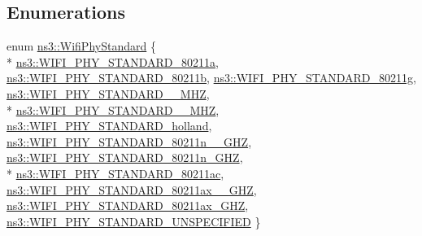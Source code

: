\subsection*{Enumerations}
\begin{DoxyCompactItemize}
\item 
enum \hyperlink{group__wifi_ga1299834f4e1c615af3ca738033b76a49}{ns3\+::\+Wifi\+Phy\+Standard} \{ \\*
\hyperlink{group__wifi_gga1299834f4e1c615af3ca738033b76a49a22db1e8022db2c3450414b86c77b11e4}{ns3\+::\+W\+I\+F\+I\+\_\+\+P\+H\+Y\+\_\+\+S\+T\+A\+N\+D\+A\+R\+D\+\_\+80211a}, 
\hyperlink{group__wifi_gga1299834f4e1c615af3ca738033b76a49a77e1cc9f77a0bce8e2bc82cbef437b5a}{ns3\+::\+W\+I\+F\+I\+\_\+\+P\+H\+Y\+\_\+\+S\+T\+A\+N\+D\+A\+R\+D\+\_\+80211b}, 
\hyperlink{group__wifi_gga1299834f4e1c615af3ca738033b76a49aeda6d90f260393ce003ec4765d8100af}{ns3\+::\+W\+I\+F\+I\+\_\+\+P\+H\+Y\+\_\+\+S\+T\+A\+N\+D\+A\+R\+D\+\_\+80211g}, 
\hyperlink{group__wifi_gga1299834f4e1c615af3ca738033b76a49aff863c98db467eb76170dc8bbe743de7}{ns3\+::\+W\+I\+F\+I\+\_\+\+P\+H\+Y\+\_\+\+S\+T\+A\+N\+D\+A\+R\+D\+\_\+\_\+M\+HZ}, 
\\*
\hyperlink{group__wifi_gga1299834f4e1c615af3ca738033b76a49a8311083bdd8ae58e73ab6e81a53fd7be}{ns3\+::\+W\+I\+F\+I\+\_\+\+P\+H\+Y\+\_\+\+S\+T\+A\+N\+D\+A\+R\+D\+\_\+\_\+M\+HZ}, 
\hyperlink{group__wifi_gga1299834f4e1c615af3ca738033b76a49aca926d77ddca0fc6d8cdcb190b2e520e}{ns3\+::\+W\+I\+F\+I\+\_\+\+P\+H\+Y\+\_\+\+S\+T\+A\+N\+D\+A\+R\+D\+\_\+holland}, 
\hyperlink{group__wifi_gga1299834f4e1c615af3ca738033b76a49a6e449a5ca14fc7c0eb36064ce04a5192}{ns3\+::\+W\+I\+F\+I\+\_\+\+P\+H\+Y\+\_\+\+S\+T\+A\+N\+D\+A\+R\+D\+\_\+80211n\+\_\+\_\+G\+HZ}, 
\hyperlink{group__wifi_gga1299834f4e1c615af3ca738033b76a49aaabe94a0be4668583c42595437b4a6c0}{ns3\+::\+W\+I\+F\+I\+\_\+\+P\+H\+Y\+\_\+\+S\+T\+A\+N\+D\+A\+R\+D\+\_\+80211n\+\_\+G\+HZ}, 
\\*
\hyperlink{group__wifi_gga1299834f4e1c615af3ca738033b76a49a7c078959de635b84fb280a955dcfb27e}{ns3\+::\+W\+I\+F\+I\+\_\+\+P\+H\+Y\+\_\+\+S\+T\+A\+N\+D\+A\+R\+D\+\_\+80211ac}, 
\hyperlink{group__wifi_gga1299834f4e1c615af3ca738033b76a49a21cd71f16aa85df0b571d52f9217f330}{ns3\+::\+W\+I\+F\+I\+\_\+\+P\+H\+Y\+\_\+\+S\+T\+A\+N\+D\+A\+R\+D\+\_\+80211ax\+\_\+\_\+G\+HZ}, 
\hyperlink{group__wifi_gga1299834f4e1c615af3ca738033b76a49af5b1e598f5b0d88c961c90ad1742355f}{ns3\+::\+W\+I\+F\+I\+\_\+\+P\+H\+Y\+\_\+\+S\+T\+A\+N\+D\+A\+R\+D\+\_\+80211ax\+\_\+G\+HZ}, 
\hyperlink{group__wifi_gga1299834f4e1c615af3ca738033b76a49a95f590f4512ff9645bba0b4f2650f92d}{ns3\+::\+W\+I\+F\+I\+\_\+\+P\+H\+Y\+\_\+\+S\+T\+A\+N\+D\+A\+R\+D\+\_\+\+U\+N\+S\+P\+E\+C\+I\+F\+I\+ED}
 \}
\end{DoxyCompactItemize}
